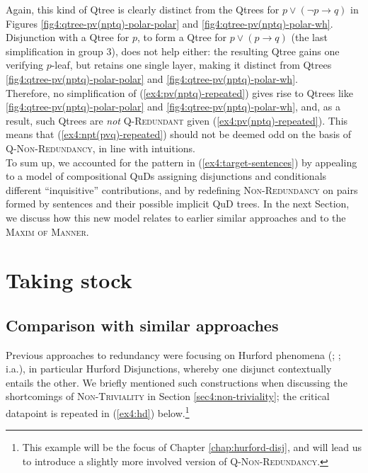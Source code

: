 Again, this kind of Qtree is clearly distinct from the Qtrees for $p \vee (\neg p \rightarrow q)$ in Figures \ref{fig4:qtree-pv(nptq)-polar-polar} and \ref{fig4:qtree-pv(nptq)-polar-wh}. Disjunction with a Qtree for $p$, to form a Qtree for $p \vee (p \rightarrow q)$ (the last simplification in group $3$), does not help either: the resulting Qtree gains one verifying $p$-leaf, but retains one single layer, making it distinct from Qtrees \ref{fig4:qtree-pv(nptq)-polar-polar} and \ref{fig4:qtree-pv(nptq)-polar-wh}.\\

Therefore, no simplification of (\ref{ex4:pv(nptq)-repeated}) gives rise to Qtrees like \ref{fig4:qtree-pv(nptq)-polar-polar} and \ref{fig4:qtree-pv(nptq)-polar-wh}, and, as a result, such Qtrees are \textit{not} \textsc{Q-Redundant} given (\ref{ex4:pv(nptq)-repeated}). This means that (\ref{ex4:npt(pvq)-repeated}) should not be deemed odd on the basis of \textsc{Q-Non-Redundancy}, in line with intuitions.\\


To sum up, we accounted for the pattern in (\ref{ex4:target-sentences}) by appealing to a model of compositional QuDs assigning disjunctions and conditionals different ``inquisitive'' contributions, and by redefining \textsc{Non-Redundancy} on pairs formed by sentences and their possible implicit QuD trees. In the next Section, we discuss how this new model relates to earlier similar approaches and to the \textsc{Maxim of Manner}.

\section{Taking stock}\label{sec4:stock}
\subsection{Comparison with similar approaches}
Previous approaches to redundancy were focusing on Hurford phenomena (; ;  i.a.), in particular Hurford Disjunctions, whereby one disjunct contextually entails the other. We briefly mentioned such constructions when discussing the shortcomings of \textsc{Non-Triviality} in Section \ref{sec4:non-triviality}; the critical datapoint is repeated in (\ref{ex4:hd}) below.\footnote{This example will be the focus of Chapter \ref{chap:hurford-disj}, and will lead us to introduce a slightly more involved version of \textsc{Q-Non-Redundancy}.}


